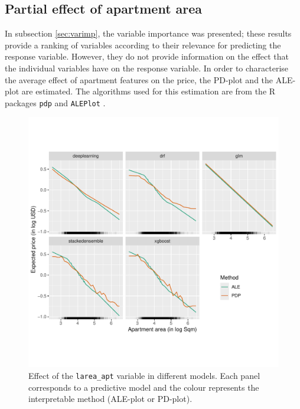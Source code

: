 \documentclass[smallextended,natbib]{svjour3}\usepackage[]{graphicx}\usepackage[]{xcolor}
\newcommand{\1}[1]{\mathbbm{1}_{#1}}
\begin{document}
\subsection{Partial effect of apartment area} \label{sub:resultados_pdp}
In subsection \ref{sec:varimp}, the variable importance was presented; these results provide a ranking of variables according to their relevance for predicting the response variable.  However, they do not provide information on the effect that the individual variables have on the response variable. In order to characterise the average effect of apartment features on the price, the PD-plot and the ALE-plot  are estimated. The algorithms used for this estimation are from the R packages \texttt{pdp} \citep{pdp} and \texttt{ALEPlot} \citep{aleplot}. 
\begin{figure}[hbpt]
    \centering
    \includegraphics[scale=.9]{figures/fig-efecto-lsub.pdf}
    \caption{Effect of the \texttt{larea\_apt} variable in different models. Each panel corresponds to a predictive model and the colour represents the interpretable method (ALE-plot or PD-plot).}
    \label{fig-pdpalesup}
\end{figure}
\end{document}
